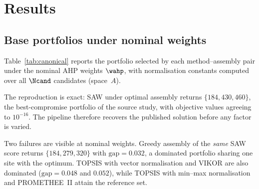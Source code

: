 
\section{Results}
\label{sec:results}

\subsection{Base portfolios under nominal weights}
\label{sec:base}

Table~\ref{tab:canonical} reports the portfolio selected by each
method--assembly pair under the nominal AHP weights $\wahp$, with
normalisation constants computed over all $\Ncand$ candidates (space~$A$).

The reproduction is exact: SAW under optimal assembly returns
$\{184,430,460\}$, the best-compromise portfolio of the source study,
with objective values agreeing to $10^{-16}$.
The pipeline therefore recovers the published solution before any
factor is varied.

Two failures are visible at nominal weights.
Greedy assembly of the \emph{same} SAW score returns $\{184,279,320\}$
with $\mathrm{gap}=0.032$, a dominated portfolio sharing one site with
the optimum.
TOPSIS with vector normalisation and VIKOR are also dominated
($\mathrm{gap}=0.048$ and $0.052$), while TOPSIS with min--max
normalisation and PROMETHEE~II attain the reference set.

